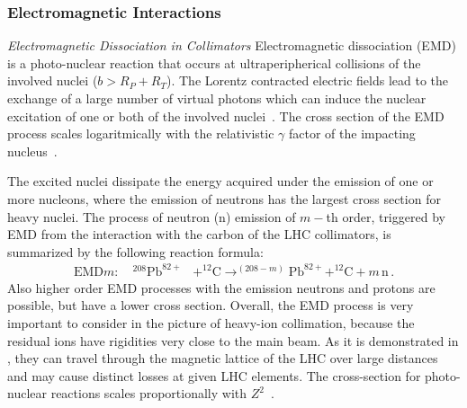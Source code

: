 \subsubsection{Electromagnetic Interactions} \label{chap:emd}
\textit{Electromagnetic Dissociation in Collimators} \newline
Electromagnetic dissociation (EMD) is a photo-nuclear reaction that occurs at ultraperipherical collisions of the involved nuclei \mbox{($b>R_P + R_T$)}. The Lorentz contracted electric fields lead to the exchange of a large number of virtual photons which can induce the nuclear excitation of one or both of the involved nuclei~\cite{PhysRevSTAB17021006}. The cross section of the EMD process scales logaritmically with the relativistic $\gamma$ factor of the impacting nucleus~\cite{PhysRevSTAB17021006}. 

The excited nuclei dissipate the energy acquired under the emission of one or more nucleons, where the emission of neutrons has the largest cross section for heavy nuclei. The process of neutron (n) emission of $m-$th order, triggered by EMD from the interaction with the carbon of the LHC collimators, is summarized by the following reaction formula:
%
\begin{align}
\text{EMD}m: \quad ^{208}\text{Pb}^{82+} &+ ^{12}\text{C} \rightarrow ^{(208-m)}\text{Pb}^{82+}  + ^{12}\text{C} + m \, \text{n} \, .
\end{align}
%
Also higher order EMD processes with the emission neutrons and protons are possible, but have a lower cross section. Overall, the EMD process is very important to consider in the picture of heavy-ion collimation, because the residual ions have rigidities very close to the main beam. As it is demonstrated in , they can travel through the magnetic lattice of the LHC over large distances and may cause distinct losses at given LHC elements. The cross-section for photo-nuclear reactions scales proportionally with $Z^2$~\cite{PhysRevSTAB17021006}.

